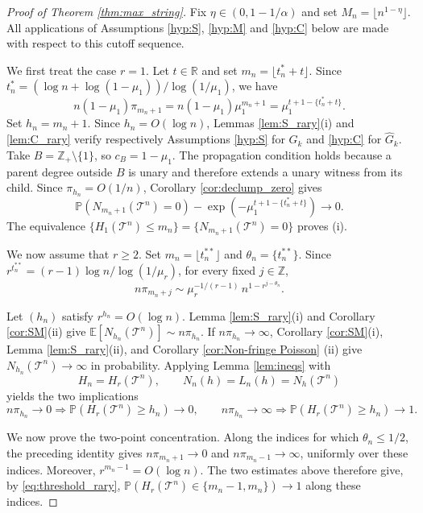 \documentclass[a4paper,11pt]{article}
\newcommand{\E}{\mathbb{E}}
\DeclareRobustCommand{\P}{\mathbb{P}}
\DeclareRobustCommand{\1}{\mathbf{1}}
\begin{document}
\begin{proof}[Proof of Theorem \ref{thm:max_string}]
Fix $\eta\in(0,1-1/\alpha)$ and set
$M_n=\lfloor n^{1-\eta}\rfloor$. All applications of Assumptions
\ref{hyp:S}, \ref{hyp:M} and \ref{hyp:C}  below are made with
respect to this cutoff sequence.

  We first treat the case $r=1$. Let $t\in\mathbb R$ and set
  $m_n=\lfloor t_n^*+t\rfloor$. Since
  $t_n^*=(\log n+\log(1-\mu_1))/\log(1/\mu_1)$, we have
  $$
    n(1-\mu_1)\pi_{m_n+1}
    =
    n(1-\mu_1)\mu_1^{m_n+1}
    =
    \mu_1^{t+1-\{t_n^*+t\}}.
  $$
Set $h_n=m_n+1$. Since $h_n=O(\log n)$, Lemmas
\ref{lem:S_rary}\textup{(i)} and \ref{lem:C_rary} verify respectively
Assumptions \ref{hyp:S} for $G_k$ and \ref{hyp:C} for $\widehat G_k$.
Take $B=\mathbb Z_+\setminus\{1\}$, so $c_B=1-\mu_1$. The propagation
condition holds because a parent degree outside $B$ is unary and therefore
extends a unary witness from its child. Since $\pi_{h_n}=O(1/n)$,
Corollary \ref{cor:declump_zero} gives
$$
\P(N_{m_n+1}(\mathcal T^n)=0)
-\exp\left(-\mu_1^{t+1-\{t_n^*+t\}}\right)\longrightarrow0.
$$
The equivalence
$\{H_1(\mathcal T^n)\le m_n\}=\{N_{m_n+1}(\mathcal T^n)=0\}$
proves \textup{(i)}.

  We now assume that $r\ge2$. Set $m_n=\lfloor t_n^{**}\rfloor$ and
  $\theta_n=\{t_n^{**}\}$. Since
  $r^{t_n^{**}}=(r-1)\log n/\log(1/\mu_r)$, for every fixed
  $j\in\mathbb Z$,
  $$
    n\pi_{m_n+j}
    \sim
    \mu_r^{-1/(r-1)}\,n^{1-r^{j-\theta_n}}.
  $$

Let $(h_n)$ satisfy $r^{h_n}=O(\log n)$. Lemma
\ref{lem:S_rary}\textup{(i)} and Corollary
\ref{cor:SM}\textup{(ii)} give
$\E[N_{h_n}(\mathcal T^n)]\sim n\pi_{h_n}$. If
$n\pi_{h_n}\to\infty$, Corollary \ref{cor:SM}\textup{(i)}, Lemma
\ref{lem:S_rary}\textup{(ii)}, and Corollary \ref{cor:Non-fringe Poisson} \textup{(ii)} give
$N_{h_n}(\mathcal T^n)\to\infty$ in probability. Applying Lemma \ref{lem:ineqs} with
$$
H_n=H_r(\mathcal T^n),
\qquad
N_n(h)=L_n(h)=N_h(\mathcal T^n)
$$  yields the two
implications
\begin{equation}
\label{eq:threshold_rary}
n\pi_{h_n}\to0\Longrightarrow
\P(H_r(\mathcal T^n)\ge h_n)\to0,
\qquad
n\pi_{h_n}\to\infty\Longrightarrow
\P(H_r(\mathcal T^n)\ge h_n)\to1.
\end{equation}

 We now prove the two-point concentration. Along the indices for which
  $\theta_n\le1/2$, the preceding identity gives
  $n\pi_{m_n+1}\to0$ and $n\pi_{m_n-1}\to\infty$, uniformly over these
  indices. Moreover, $r^{m_n-1}=O(\log n)$. The two estimates above therefore
  give, by \eqref{eq:threshold_rary}, $
    \P(H_r(\mathcal T^n)\in\{m_n-1,m_n\})\to1$
  along these indices.


\end{proof}
\end{document}
